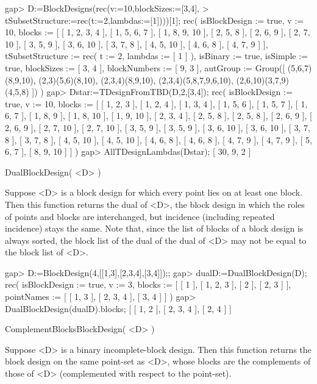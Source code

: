 \beginexample
gap> D:=BlockDesigns(rec(v:=10,blockSizes:=[3,4],           
>          tSubsetStructure:=rec(t:=2,lambdas:=[1])))[1];
rec( isBlockDesign := true, v := 10, 
  blocks := [ [ 1, 2, 3, 4 ], [ 1, 5, 6, 7 ], [ 1, 8, 9, 10 ], [ 2, 5, 8 ], 
      [ 2, 6, 9 ], [ 2, 7, 10 ], [ 3, 5, 9 ], [ 3, 6, 10 ], [ 3, 7, 8 ], 
      [ 4, 5, 10 ], [ 4, 6, 8 ], [ 4, 7, 9 ] ], 
  tSubsetStructure := rec( t := 2, lambdas := [ 1 ] ), isBinary := true, 
  isSimple := true, blockSizes := [ 3, 4 ], blockNumbers := [ 9, 3 ], 
  autGroup := Group([ (5,6,7)(8,9,10), (2,3)(5,6)(8,10), (2,3,4)(8,9,10), 
      (2,3,4)(5,8,7,9,6,10), (2,6,10)(3,7,9)(4,5,8) ]) )
gap> Dstar:=TDesignFromTBD(D,2,[3,4]);                       
rec( isBlockDesign := true, v := 10, 
  blocks := [ [ 1, 2, 3 ], [ 1, 2, 4 ], [ 1, 3, 4 ], [ 1, 5, 6 ], 
      [ 1, 5, 7 ], [ 1, 6, 7 ], [ 1, 8, 9 ], [ 1, 8, 10 ], [ 1, 9, 10 ], 
      [ 2, 3, 4 ], [ 2, 5, 8 ], [ 2, 5, 8 ], [ 2, 6, 9 ], [ 2, 6, 9 ], 
      [ 2, 7, 10 ], [ 2, 7, 10 ], [ 3, 5, 9 ], [ 3, 5, 9 ], [ 3, 6, 10 ], 
      [ 3, 6, 10 ], [ 3, 7, 8 ], [ 3, 7, 8 ], [ 4, 5, 10 ], [ 4, 5, 10 ], 
      [ 4, 6, 8 ], [ 4, 6, 8 ], [ 4, 7, 9 ], [ 4, 7, 9 ], [ 5, 6, 7 ], 
      [ 8, 9, 10 ] ] )
gap> AllTDesignLambdas(Dstar);
[ 30, 9, 2 ]
\endexample



\>DualBlockDesign( <D> )

Suppose <D> is a block design for which every point lies on at least
one block.  Then this function returns the dual of <D>, the block design
in which the roles of points and blocks are interchanged, but incidence
(including repeated incidence) stays the same.  Note that, since the
list of blocks of a block design is always sorted, the block list of
the dual of the dual of <D> may not be equal to the block list of <D>.

\beginexample
gap> D:=BlockDesign(4,[[1,3],[2,3,4],[3,4]]);;
gap> dualD:=DualBlockDesign(D);
rec( isBlockDesign := true, v := 3, 
  blocks := [ [ 1 ], [ 1, 2, 3 ], [ 2 ], [ 2, 3 ] ], 
  pointNames := [ [ 1, 3 ], [ 2, 3, 4 ], [ 3, 4 ] ] )
gap> DualBlockDesign(dualD).blocks;           
[ [ 1, 2 ], [ 2, 3, 4 ], [ 2, 4 ] ]
\endexample



\>ComplementBlocksBlockDesign( <D> )

Suppose <D> is a binary incomplete-block design.
Then this function returns the block design on the same
point-set as <D>, whose blocks are the complements of
those of <D> (complemented with respect to the point-set).

